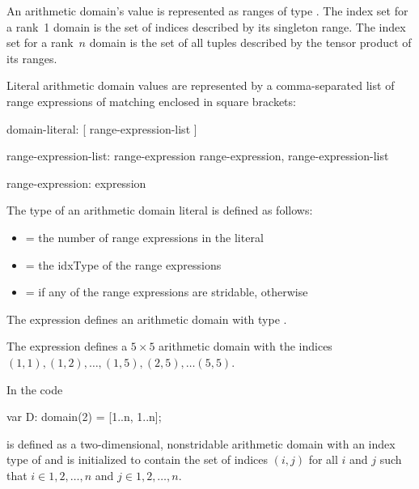An arithmetic domain's value is represented as  ranges of
 type   .  The index set for a rank~1 domain is the set of indices
 described by its singleton range.  The index set for a rank~$n$
 domain is the set of all  tuples described by the
 tensor product of its ranges.


Literal arithmetic domain values are represented by a comma-separated
list of range expressions of matching  enclosed in
square brackets:

%
%

\begin{syntax}
domain-literal:
  [ range-expression-list ]

range-expression-list:
  range-expression
  range-expression, range-expression-list

range-expression:
  expression
\end{syntax}

\noindent The type of an arithmetic domain literal is defined as follows:

\begin{itemize}

\item {} = the number of range expressions in the literal

\item {} = the idxType of the range expressions

\item {} =  if any of the range expressions
are stridable, otherwise 

\end{itemize}

\begin{example}
The expression \chpl{[1..5, 1..5]} defines an arithmetic domain with
type   .
\end{example}

\begin{example}
The expression \chpl{[1..5, 1..5]} defines a $5 \times 5$ arithmetic
domain with the indices $(1, 1), (1, 2), \ldots, (1, 5), (2, 5), \ldots (5, 5)$.
\end{example}

\begin{example}
In the code
\begin{chapel}
var D: domain(2) = [1..n, 1..n];
\end{chapel}

 is defined as a two-dimensional, nonstridable arithmetic
domain with an index type of  and is initialized to
contain the set of indices $(i,j)$ for all $i$ and $j$ such that
$i \in {1, 2, \ldots, n}$ and $j \in {1, 2, \ldots, n}$.
\end{example}

